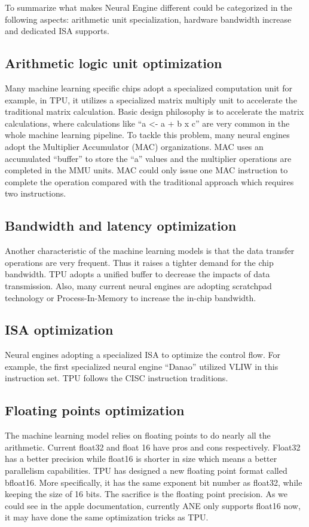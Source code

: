 \documentclass[11pt]{article}
\begin{document}
To summarize what makes Neural Engine different could be categorized in the following aspects: arithmetic unit specialization, hardware bandwidth increase and dedicated ISA supports.

\subsection*{Arithmetic logic unit optimization}
Many machine learning specific chips adopt a specialized computation unit for example, in TPU, it utilizes a specialized matrix multiply unit to accelerate the traditional matrix calculation. Basic design philosophy is to accelerate the matrix calculations, where calculations like “a <- a + b x c” are very common in the whole machine learning pipeline. To tackle this problem, many neural engines adopt the Multiplier Accumulator (MAC) organizations. MAC uses an accumulated “buffer” to store the “a” values and the multiplier operations are completed in the MMU units. MAC could only issue one MAC instruction to complete the operation compared with the traditional approach which requires two instructions.

\subsection*{Bandwidth and latency optimization}
Another characteristic of the machine learning models is that the data transfer operations are very frequent. Thus it raises a tighter demand for the chip bandwidth. TPU adopts a unified buffer to decrease the impacts of data transmission. Also, many current neural engines are adopting scratchpad technology or Process-In-Memory to increase the in-chip bandwidth.

\subsection*{ISA optimization}
Neural engines adopting a specialized ISA to optimize the control flow. For example, the first specialized neural engine “Danao” utilized VLIW in this instruction set. TPU follows the CISC instruction traditions.

\subsection*{Floating points optimization}
The machine learning model relies on floating points to do nearly all the arithmetic. Current float32 and float 16 have pros and cons respectively. Float32 has a better precision while float16 is shorter in size which means a better parallelism capabilities. TPU has designed a new floating point format called bfloat16. More specifically, it has the same exponent bit number as float32, while keeping the size of 16 bits. The sacrifice is the floating point precision. As we could see in the apple documentation, currently ANE only supports float16 now, it may have done the same optimization tricks as TPU.
\end{document}
